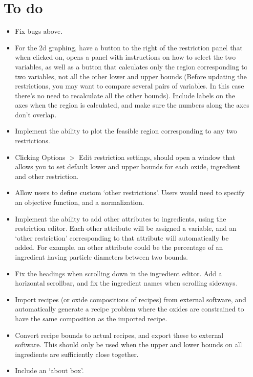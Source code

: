 \documentclass[a4paper,10pt]{article}
\begin{document}
\section{To do}
\begin{itemize}
\item Fix bugs above.
\item For the 2d graphing, have a button to the right of the restriction panel that when clicked on, opens a panel with instructions on how to select the two variables, as well as a button that calculates only the region corresponding to two variables, not all the other lower and upper bounds (Before updating the restrictions, you may want to compare several pairs of variables. In this case there's no need to recalculate all the other bounds). Include labels on the axes when the region is calculated, and make sure the numbers along the axes don't overlap. 
\item Implement the ability to plot the feasible region corresponding to any two restrictions.
\item Clicking Options $>$ Edit restriction settings, should open a window that allows you to set default lower and upper bounds for each oxide, ingredient and other restriction.
\item Allow users to define custom `other restrictions'. Users would need to specify an objective function, and a normalization.
\item Implement the ability to add other attributes to ingredients, using the restriction editor. Each other attribute will be assigned a variable, and an `other restriction' corresponding to that attribute will automatically be added. For example, an other attribute could be the percentage of an ingredient having particle diameters between two bounds.
\item Fix the headings when scrolling down in the ingredient editor. Add a horizontal scrollbar, and fix the ingredient names when scrolling sideways.
\item Import recipes (or oxide compositions of recipes) from external software, and automatically generate a recipe problem where the oxides are constrained to have the same composition as the imported recipe.
\item Convert recipe bounds to actual recipes, and export these to external software. This should only be used when the upper and lower bounds on all ingredients are sufficiently close together.
\item Include an `about box'. 
\end{itemize}
\end{document}
